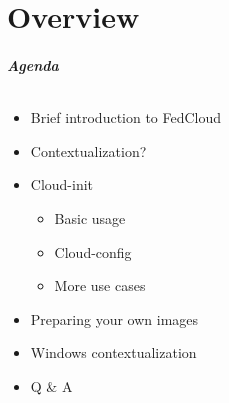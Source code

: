 \part{Overview}

\begin{frame}
  \frametitle{Agenda}
  \framesubtitle{}
  \begin{itemize}
    \item Brief introduction to FedCloud 
    \item Contextualization?
    \item Cloud-init 
    \begin{itemize}
        \item Basic usage 
        \item Cloud-config
        \item More use cases
    \end{itemize}
    \item Preparing your own images 
    \item Windows contextualization
    \item Q \& A
  \end{itemize}
\end{frame}
